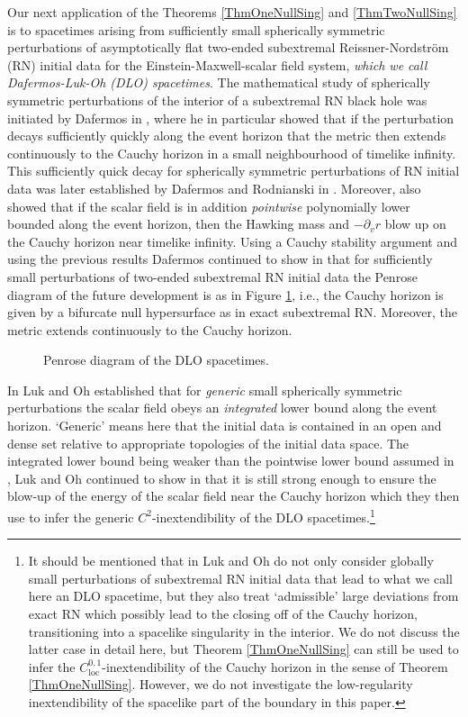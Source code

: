 \documentclass[reqno]{article}
\newcommand{\loc}{\mathrm{loc}}
\newcommand{\rd}{\partial}
\begin{document}
Our next application of the Theorems \ref{ThmOneNullSing} and \ref{ThmTwoNullSing} is to spacetimes arising from sufficiently small spherically symmetric perturbations of asymptotically flat two-ended subextremal Reissner-Nordstr\"om (RN) initial data for the Einstein-Maxwell-scalar field system, \emph{which we call Dafermos-Luk-Oh (DLO) spacetimes}. The mathematical study of spherically symmetric perturbations of the interior of a subextremal RN black hole was initiated by Dafermos in \cite{Daf03}, \cite{Daf05a} where he in particular showed that if the perturbation decays sufficiently quickly along the event horizon that the metric then extends continuously to the Cauchy horizon in a small neighbourhood of timelike infinity. This sufficiently quick decay for spherically symmetric perturbations of RN initial data was later established by Dafermos and Rodnianski in \cite{DafRod05}. Moreover, \cite{Daf05a} also showed that if the scalar field is in addition \emph{pointwise} polynomially lower bounded along the event horizon, then the Hawking mass and $-\rd_vr$ blow up on the Cauchy horizon near timelike infinity. Using a Cauchy stability argument and using the previous results Dafermos continued to show in \cite{Daf14} that for sufficiently small perturbations of two-ended subextremal RN initial data the Penrose diagram of the future development is as in Figure \ref{FigPenroseDLO}, i.e., the Cauchy horizon is given by a bifurcate null hypersurface as in exact subextremal RN. Moreover, the metric extends continuously to the Cauchy horizon. 
\begin{figure}[h]
\centering
 \def\svgwidth{8cm}
   
      \caption{Penrose diagram of the DLO spacetimes.} \label{FigPenroseDLO}
\end{figure}
In \cite{LukOh19II} Luk and Oh established that for \emph{generic} small spherically symmetric perturbations the scalar field obeys an \emph{integrated} lower bound along the event horizon. `Generic' means here that the initial data is contained in an open and dense set relative to appropriate topologies of the initial data space. The integrated lower bound being weaker than the pointwise lower bound assumed in \cite{Daf05a}, Luk and Oh continued to show in \cite{LukOh19I} that it is still strong enough to ensure the blow-up of the energy of the scalar field near the Cauchy horizon which they then use to infer the generic $C^2$-inextendibility of the DLO spacetimes.\footnote{It should be mentioned that in \cite{LukOh19I} Luk and Oh do not only consider globally small perturbations of subextremal RN initial data that lead to what we call here an DLO spacetime, but they also treat `admissible' large deviations from exact RN which possibly lead to the closing off of the Cauchy horizon, transitioning into a spacelike singularity in the interior. We do not discuss the latter case in detail here, but Theorem \ref{ThmOneNullSing} can still be used to infer the $C^{0,1}_{\loc}$-inextendibility of the Cauchy horizon in the sense of Theorem \ref{ThmOneNullSing}. However, we do not investigate the low-regularity inextendibility of the spacelike part of the boundary in this paper.}
\end{document}
